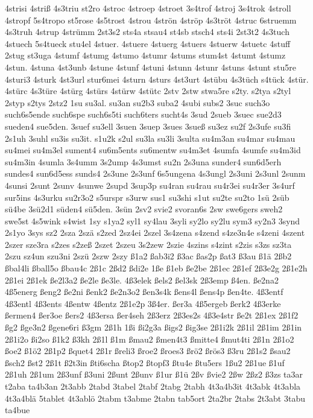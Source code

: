 {4strisi
4striß
4s3triu
st2ro
4stroc
4stroep
4stroet
3s4trof
4stroj
3s4trok
4stroll
4stropf
5s4tropo
st5rose
4s5trost
4strou
4strön
4ströp
4s3tröt
4struc
6struemm
4s3truh
4strup
4strümm
2st3s2
sts4a
stsau4
st4sb
stsch4
sts4i
2st3t2
4s3tuch
4stuech
5s4tueck
stu4el
4stuer.
4stuere
4stuerg
4stuers
4stuerw
4stuetc
4stuff
2stug
st3uga
4stumf
4stumg
4stumo
4stumr
4stums
stum4st
4stumt
4stumz
4stun.
4stuna
4st3unb
4stune
4stunf
4stuni
4stunn
4stunr
4stuns
4stunt
stu5re
4sturi3
4sturk
4st3url
stur6mei
4sturn
4sturs
4st3urt
4stübu
4s3tüch
s4tück
4stür.
4stürc
4s3türe
4stürg
4stürs
4stürw
4stütc
2stv
2stw
stwa5re
s2ty.
s2tya
s2tyl
2styp
s2tys
2stz2
1su
su3al.
su3an
su2b3
suba2
4subi
subs2
3suc
such3o
such6s5ende
such6spe
such6s5ti
such6ters
sucht4s
3sud
2sueb
3suec
sue2d3
sueden4
sue5den.
3suef
su3ell
3suen
3suep
3sues
3sueß
su3ez
su2f
2s3ufe
su3fi
2s1uh
3suhl
su3is
su3it.
s1u2k
s2ul
su3la
su3li
3sulta
su4m3an
su4mar
su4mau
su4mei
su4m3el
sument4
su6m5ents
su6mentw
su4m3et
4sumfa
4sumfe
su4m3id
su4m3in
4sumla
3s4umm
3s2ump
4s3umst
su2n
2s3una
sunder4
sun6d5erh
sundes4
sun6d5ess
sunds4
2s3une
2s3unf
6s5ungena
4s3ungl
2s3uni
2s3unl
2sunm
4sunsi
2sunt
2sunv
4sunwe
2supd
3sup3p
su4ran
su4rau
su4r3ei
su4r3er
3s4urf
sur5ins
4s3urku
su2r3o2
s5urspr
s3urw
sus1
su3shi
s1ut
su2te
su2to
1sü
2süb
sü4be
3sü2d1
süden4
sü5den.
3sün
2sv2
svie2
svoran6s
2sw
swe6gers
sweh2
swe5st
4s5wink
s4wist
1sy
s1ya2
syl1
sy4lau
3syli
sy2lo
sy2lu
sym3
sy2n3
3synd
2s1yo
3sys
sz2
2sza
2szä
s2zed
2sz4ei
2szel
3s4zena
s4zend
s4ze3n4e
s4zeni
4szent
2szer
sze3ra
s2zes
s2zeß
2szet
2szeu
3s2zew
2szie
4szins
s4zint
s2zis
s3zs
sz3ta
2szu
sz4un
szu3ni
2szü
2szw
2szy
ß1a2
ßab3i2
ß3ac
ßas2p
ßat3
ß3au
ß1ä
2ßb2
ßbal4li
ßball5o
ßbau4c
2ß1c
2ßd2
ßdi2e
1ße
ß1eb
ße2be
2ß1ec
2ß1ef
2ß3e2g
2ß1e2h
2ß1ei
2ß1ek
ße2l3a2
ße2le
ße3le.
4ß3elek
ßels2
ßel3sk
2ß3emp
ß4en.
ße2na2
4ß5energ
ßeng2
ße2ni
ßenk2
ße2n3o2
ßen3s4k
ßens4l
ßens4p
ßen4te.
4ß3entf
4ß3entl
4ß3ents
4ßentw
4ßentz
2ß1e2p
3ß4er.
ßer3a
4ß5ergeb
ßerk2
4ß3erke
ßermen4
ßer3oe
ßers2
4ß3ersa
ßer4seh
2ß3erz
2ß3es2s
4ß3e4str
ße2t
2ß1ex
2ß1f2
ßg2
ßge3n2
ßgene6ri
ß3gm
2ß1h
1ßi
ßi2g3a
ßigs2
ßig3se
2ß1i2k
2ß1il
2ß1im
2ß1in
2ß1i2o
ßi2so
ß1k2
ß3kh
2ß1l
ß1m
ßmau2
ßmen4t3
ßmitte4
ßmut4ti
2ß1n
2ß1o2
ßoe2
ß1ö2
2ß1p2
ßquet4
2ß1r
ßreli3
ßroe2
ßroes3
ßrö2
ßrös3
ß3ru
2ß1s2
ßsau2
ßsch2
ßst2
2ß1t
ß2t3in
ßti6scha
ßtop2
ßtopf3
ßtu4e
ßtu5ers
1ßu2
2ß1ue
ß1uf
2ß1uh
2ß1um
2ß3unf
ß3uni
2ßunt
2ßunv
ß1ur
ß1ü
2ßv
ßvie2
2ßw
2ßz2
ß3zs
ta3ar
t2aba
ta4b3an
2t3abb
2tabd
3tabel
2tabf
2tabg
2tabh
4t3a4b3it
4t3abk
4t3abla
4t3a4blä
5tablet
4t3ablö
2tabm
t3abme
2tabn
tab5ort
2ta2br
2tabs
2t3abt
3tabu
ta4bue
}
